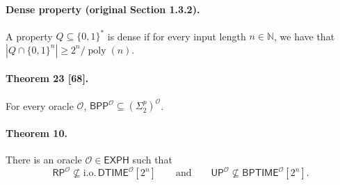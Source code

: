 \documentclass[10pt,a4paper]{article}
\begin{document}
\paragraph{Dense property (original Section 1.3.2).} A property $Q\subseteq\{0,1\}^*$ is dense if for every input length $n\in\mathbb N$, we have that $|Q\cap\{0,1\}^n|\geq2^n/\operatorname{poly}(n)$.
\paragraph{Theorem 23 [68].} For every oracle $\mathcal O$, $\mathsf{BPP}^{\mathcal O}\subseteq(\Sigma^p_2)^{\mathcal O}$.

\paragraph{Theorem 10.} There is an oracle $\mathcal O\in\mathsf{EXPH}$ such that
\[\mathsf{RP}^{\mathcal O}\not\subseteq\mathrm{i.o.}\,\mathsf{DTIME}^{\mathcal O}[2^n]\qquad\text{and}\qquad\mathsf{UP}^{\mathcal O}\not\subseteq\mathsf{BPTIME}^{\mathcal O}[2^n].\]
\end{document}
